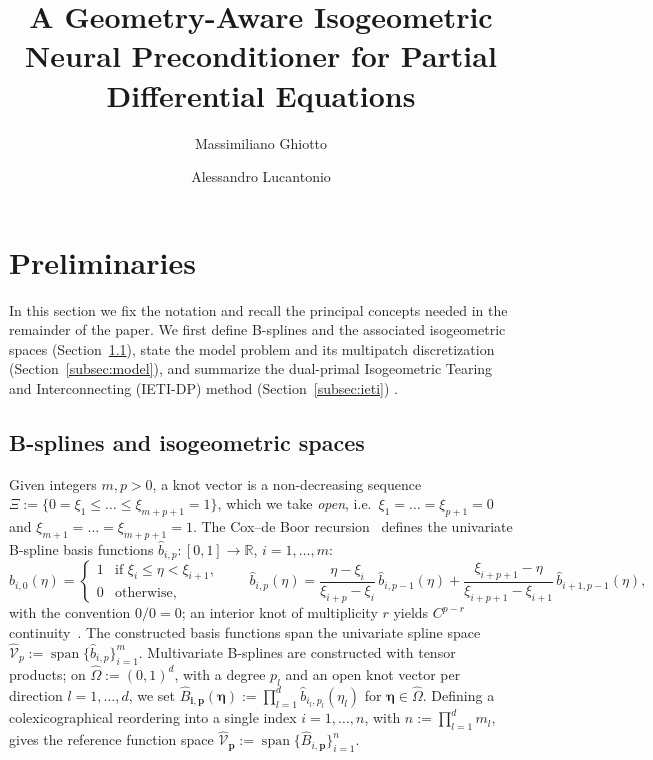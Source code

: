 \documentclass{article}
\title{A Geometry-Aware Isogeometric Neural Preconditioner for Partial Differential Equations}
\date{}
\author[1]{Massimiliano Ghiotto}
\author[2]{Alessandro Lucantonio}
\affil[1]{Department of Mathematics, University of Pavia}
\affil[2]{Department of Mechanical and Production Engineering, Aarhus University}
\newcommand{\vect}[1]{\boldsymbol{#1}}
\newcommand{\R}{\mathbb{R}}
\DeclareMathOperator{\spann}{span}
\newcommand{\refdom}{\widehat{\Omega}}            %
\newcommand{\bsuni}[2]{\widehat{b}_{#1,#2}}      %
\newcommand{\Bref}[2]{\widehat{B}_{#1,#2}}       %
\newcommand{\Shat}[1]{\widehat{\mathcal{V}}_{#1}} %
\theoremstyle{plain}
\numberwithin{equation}{section}
\begin{document}
\maketitle
\linenumbers

\begin{abstract}
\end{abstract}

\section{Preliminaries} \label{sec:preliminaries}

In this section we fix the notation and recall the principal concepts needed in the
remainder of the paper. We first define B-splines and the associated
isogeometric spaces (Section~\ref{subsec:bsplines}), state the model problem and
its multipatch discretization (Section~\ref{subsec:model}), and summarize the
dual-primal Isogeometric Tearing and Interconnecting (IETI-DP) method
(Section~\ref{subsec:ieti}) \cite{kleiss2012ieti}.

\subsection{B-splines and isogeometric spaces} \label{subsec:bsplines}

Given integers $m, p > 0$, a knot vector is a non-decreasing sequence
$\Xi := \{0 = \xi_1 \le \dots \le \xi_{m+p+1} = 1\}$, which we take \emph{open},
i.e.\ $\xi_1 = \dots = \xi_{p+1} = 0$ and $\xi_{m+1} = \dots = \xi_{m+p+1} = 1$.
The Cox--de Boor recursion~\cite{de1978practical} defines the univariate B-spline
basis functions $\bsuni{i}{p} : [0,1] \to \R$, $i = 1, \dots, m$:
\begin{equation*}
    \bsuni{i}{0}(\eta) =
    \begin{cases}
        1 & \text{if } \xi_i \le \eta < \xi_{i+1}, \\
        0 & \text{otherwise},
    \end{cases}
    \qquad
    \bsuni{i}{p}(\eta) =
    \frac{\eta - \xi_i}{\xi_{i+p} - \xi_i}\, \bsuni{i}{p-1}(\eta)
    + \frac{\xi_{i+p+1} - \eta}{\xi_{i+p+1} - \xi_{i+1}}\, \bsuni{i+1}{p-1}(\eta),
\end{equation*}
with the convention $0/0 = 0$; an interior knot of multiplicity $r$ yields
$C^{p-r}$ continuity~\cite{cottrell2009isogeometric}. The constructed basis functions span the univariate
spline space $\Shat{p} := \spann\{\bsuni{i}{p}\}_{i=1}^{m}$.
Multivariate B-splines are constructed with tensor products; on $\refdom := (0,1)^d$,
with a degree $p_l$ and an open knot vector per direction $l = 1, \dots, d$, we
set $\Bref{\vect{i}}{\vect{p}}(\vect{\eta}) := \prod_{l=1}^{d}
    \bsuni{i_l}{p_l}(\eta_l)$ for $\vect{\eta} \in \refdom$. Defining a
colexicographical reordering into a single index $i = 1, \dots, n$, with
$n := \prod_{l=1}^{d} m_l$, gives the reference function space $\Shat{\vect{p}} :=
    \spann\{\Bref{i}{\vect{p}}\}_{i=1}^{n}$.
\end{document}
